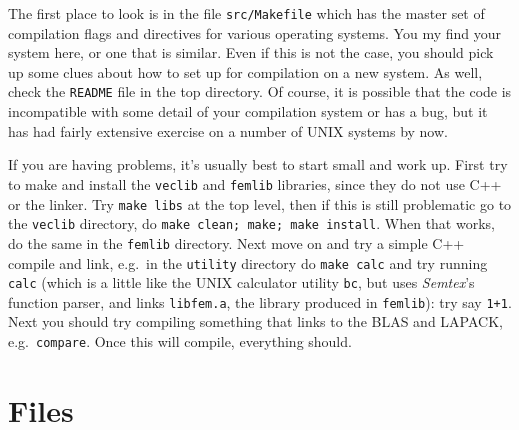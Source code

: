 \documentclass[11pt,a4paper]{report}
\newcommand{\Semtex}{\emph{Semtex}}
\begin{document}
The first place to look is in the file \texttt{src/Makefile} which has
the master set of compilation flags and directives for various
operating systems. You my find your system here, or one that is
similar. Even if this is not the case, you should pick up some clues
about how to set up for compilation on a new system.  As well, check
the \texttt{README} file in the top directory. Of course, it is
possible that the code is incompatible with some detail of your
compilation system or has a bug, but it has had fairly extensive
exercise on a number of UNIX systems by now. 

If you are having problems, it's usually best to start small and work
up. First try to make and install the \verb+veclib+ and \verb+femlib+
libraries, since they do not use C++ or the linker. Try
\verb+make libs+ at the top level, then if this is still problematic
go to the \verb+veclib+ directory, do \texttt{make clean; make; make
install}. When that works, do the same in the \texttt{femlib}
directory. Next move on and try a simple C++ compile and link, e.g.\
in the \texttt{utility} directory do \texttt{make calc} and try
running \texttt{calc} (which is a little like the UNIX calculator
utility \texttt{bc}, but uses \Semtex's function parser, and links
\texttt{libfem.a}, the library produced in \texttt{femlib}): try say
\texttt{1+1}. Next you should try compiling something that links to
the BLAS and LAPACK, e.g.\ \texttt{compare}. Once this will compile,
everything should.


\section{Files}
\end{document}
